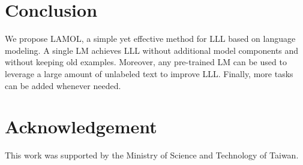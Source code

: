 \documentclass{article} \usepackage{iclr2020_conference,times}
\begin{document}
\begin{table}[!tp]
    \centering
    \caption{Summary of results on text classification tasks using averaged EM score (equivalent to averaged accuracy in \cite{d2019episodic}) of models at last epoch of last task. The four orders mirror those in \cite{d2019episodic}. For MBPA++ (our impl.) and , the results are averaged over two runs. The -value of pairted -test between eight numbers of MBPA++ (our impl.) and  is smaller than 1\%, which shows that there is significant difference. Our implementation of MBPA++ is available at \url{https://github.com/Daikon-Sun/EM-in-LLL}.}
    \label{tab:text_cls}
\end{table}

 
\section{Conclusion}

We propose LAMOL, a simple yet effective method for LLL based on language modeling.
A single LM achieves LLL without additional model components and without keeping old examples.
Moreover, any pre-trained LM can be used to leverage a large amount of unlabeled text to improve LLL.
Finally, more tasks can be added whenever needed. 


\section*{Acknowledgement}
This work was supported by the Ministry of Science and Technology of
Taiwan.




\clearpage
\appendix
\end{document}
